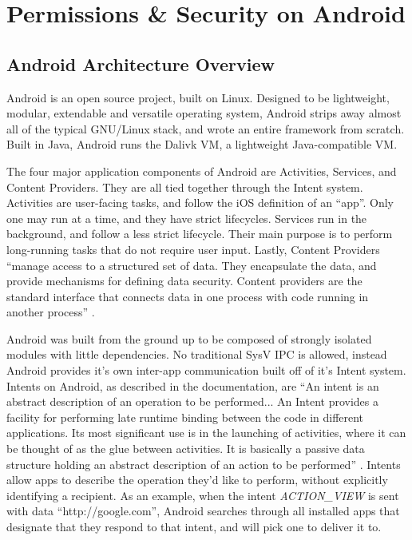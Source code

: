 \chapter{Permissions \& Security on Android}
\label{sec:permissions}

\section{Android Architecture Overview}
Android is an open source project, built on Linux. Designed to be lightweight, modular, extendable and versatile operating system, Android strips away almost all of the typical GNU/Linux stack, and wrote an entire framework from scratch. Built in Java, Android runs the Dalivk VM, a lightweight Java-compatible VM. 

The four major application components of Android are Activities, Services, and Content Providers. They are all tied together through the Intent system. Activities are user-facing tasks, and follow the iOS definition of an ``app''. Only one may run at a time, and they have strict lifecycles. Services run in the background, and follow a less strict lifecycle. Their main purpose is to perform long-running tasks that do not require user input. Lastly, Content Providers ``manage access to a structured set of data. They encapsulate the data, and provide mechanisms for defining data security. Content providers are the standard interface that connects data in one process with code running in another process'' \citep{androidcontentproviders}.

Android was built from the ground up to be composed of strongly isolated modules with little dependencies. No traditional SysV IPC is allowed, instead Android provides it's own inter-app communication built off of it's Intent system. Intents on Android, as described in the documentation, are ``An intent is an abstract description of an operation to be performed... An Intent provides a facility for performing late runtime binding between the code in different applications. Its most significant use is in the launching of activities, where it can be thought of as the glue between activities. It is basically a passive data structure holding an abstract description of an action to be performed'' \citep{androidintents}. Intents allow apps to describe the operation they'd like to perform, without explicitly identifying a recipient. As an example, when the intent \textit{ACTION\_VIEW} is sent with data ``http://google.com'', Android searches through all installed apps that designate that they respond to that intent, and will pick one to deliver it to. 

